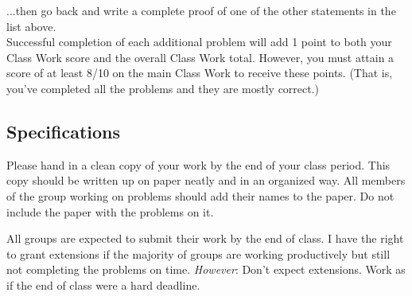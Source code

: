 \documentclass[11pt]{article}
\begin{document}
...then go back and write a complete proof of one of the other statements in the list above. \\

Successful completion of each additional problem will add 1 point to both your Class Work score and the overall Class Work total. However, you must attain a score of at least 8/10 on the main Class Work to receive these points. (That is, you've completed all the problems and they are mostly correct.) 	
	
\subsection*{Specifications}

Please hand in a clean copy of your work by the end of your class period. This copy should be written up on paper neatly and in an organized way. All members of the group working on problems should add their names to the paper. Do not include the paper with the problems on it. 

All groups are expected to submit their work by the end of class. I have the right to grant extensions if the majority of groups are working productively but still not completing the problems on time. \emph{However}: Don't expect extensions. Work as if the end of class were a hard deadline. 
\end{document}
